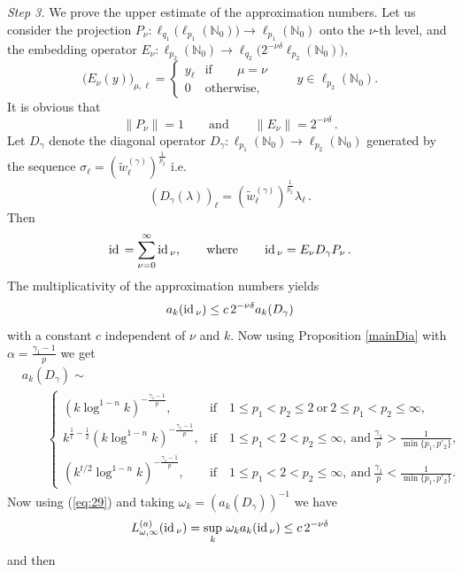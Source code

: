 \documentclass[12pt]{article}
\def\id{\mathop{\rm id \,}\nolimits}
\newcommand{\N}{{\mathbb N}}
\begin{document}
{\em Step 3.}  We prove the upper estimate of the approximation numbers. 
Let us consider the projection 
$P_\nu: \ell_{q_1}\big(\ell_{p_1}(\N_0)\big) \rightarrow \ell_{p_1}(\N_0)$
onto the $\nu$-th level,  and  the embedding operator $E_\nu: \ell_{p_2}(\N_0) \rightarrow \ell_{q_2}\big(2^{-\nu \delta} \ell_{p_2}(\N_0)\big)$, 
\[
\big(E_\nu(y)\big)_{\mu, \ell}= \begin{cases}
	y_\ell & \text{if}\qquad  \mu = \nu\\
	0 & \text{otherwise}, 
\end{cases}
\qquad y \in  \ell_{p_2}(\N_0 ).
\]
It is  obvious that 
\begin{equation}\nonumber
	\|P_\nu\| = 1 \qquad \text{and}\qquad \|E_\nu\| = 2^{-\nu\delta}\, .
\end{equation}
Let $D_\gamma$ denote the diagonal operator $D_\gamma: \ell_{p_1}(\N_0) \rightarrow \ell_{p_2}(\N_0)$ generated by the sequence
$\sigma_\ell =  (\widetilde{w}_\ell^{(\gamma)})^{\frac{1}{p_2}}$ i.e. 
$$
(D_\gamma(\lambda))_\ell = (\widetilde{w}^{(\gamma)}_\ell)^{\frac{1}{p_2}} \lambda_\ell\, .
$$ 
Then
$$
\id = \sum_{\nu=0}^\infty \id_\nu, \qquad \text{where} \qquad
\id_\nu=E_\nu D_\gamma P_\nu \,.
$$
The multiplicativity of the  approximation numbers yields
\begin{equation}
	a_k(\id_\nu) \leq c \,2^{-\nu\delta} a_k(D_\gamma)
	\label{eq:29}
\end{equation}
with a constant $c$ independent of $\nu$ and $k$. Now using  Proposition  \ref{mainDia} 
 with $\alpha=	\frac{\gamma_1-1}{p}$  we get 
\begin{align*}
&a_k(D_\gamma)\sim  \\ 
&\qquad	\left\{ \begin{array}{ll} (k\log^{1-n} k)^{-\frac{\gamma_{1}-1}{p}}, &{\mathrm{if}\quad 1\leq p_1< p_2\leq2\ \mathrm{or}\ 2\leq p_1< p_2\leq\infty,}\\  k^{\frac 1 t -\frac 1 2}(k\log^{1-n} k)^{-\frac{\gamma_{1}-1}{p}}, &{\mathrm{if}\quad 1\leq p_1<2< p_2 \leq\infty, %
 \ \mathrm{and}\ 	\frac{\gamma_1}{p} > \frac{1}{\min\{p_1,p'_2\}},}\\ (k^{t/2}\log^{1-n}k)^{-\frac{\gamma_{1}-1}{p}}, & {\mathrm{if}\quad 1\leq p_1<2< p_2 \leq\infty, %
  \ \mathrm{and}\ 	\frac{\gamma_1}{p} < \frac{1}{\min\{p_1,p'_2\}}.}		
	\end{array}\right.
\end{align*}
Now using (\ref{eq:29}) and taking $\omega_k=(a_k(D_\gamma))^{-1}$ we have
$$
L_{\omega,\infty}^{(a)}(\id_\nu)=\sup _k \, \omega_k a_k(\id_\nu) \leq c
\,2^{-\nu\delta}  
$$
and then
\end{document}
